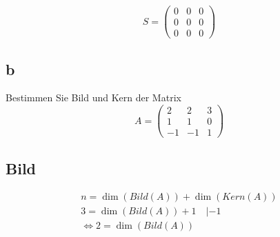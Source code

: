 \[
S = \begin{pmatrix}
    0 & 0 & 0 \\
    0 & 0 & 0 \\ 
    0 & 0 & 0
\end{pmatrix}
\]

\subsection{b}
Bestimmen Sie Bild und Kern der Matrix
\[
A=\begin{pmatrix}
    2 & 2 & 3 \\ 1 & 1 & 0 \\ -1 & -1 & 1
\end{pmatrix}
\]

\subsection*{Bild}

\begin{align*}
    n = \dim(Bild(A)) + \dim(Kern(A)) \\
    3 = \dim(Bild(A)) + 1 \quad |-1 \\
    \Leftrightarrow  2 = \dim(Bild(A))
\end{align*}

